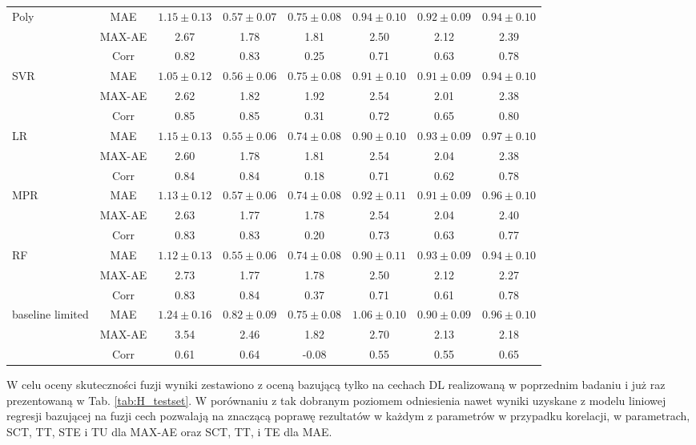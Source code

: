 \begin{table}[h]
\begin{center}
\begin{tabular}{lc||c|c|c|c|c|c}
			\hline
			\multirow{3}{*}{Poly}
			& MAE & $1.15\pm0.13$ & $0.57\pm0.07$ & $0.75\pm0.08$ & $0.94\pm0.10$ & $0.92\pm0.09$ & $0.94\pm0.10$\\
			& MAX-AE & 2.67 & 1.78 & 1.81 & 2.50 & 2.12 & 2.39 \\
			& Corr   & 0.82 & 0.83 & 0.25 & 0.71 & 0.63 & 0.78 \\
			\hline
			\multirow{3}{*}{SVR}
			& MAE & $1.05\pm0.12$ & $0.56\pm0.06$ & $0.75\pm0.08$ & $0.91\pm0.10$ & $0.91\pm0.09$ & $0.94\pm0.10$\\
			& MAX-AE & 2.62 & 1.82 & 1.92 & 2.54 & 2.01 & 2.38 \\
			& Corr   & 0.85 & 0.85 & 0.31 & 0.72 & 0.65 & 0.80 \\
			\hline
			\multirow{3}{*}{LR}
			& MAE & $1.15\pm0.13$ & $0.55\pm0.06$ & $0.74\pm0.08$ & $0.90\pm0.10$ & $0.93\pm0.09$ & $0.97\pm0.10$\\
			& MAX-AE & 2.60 & 1.78 & 1.81 & 2.54 & 2.04 & 2.38 \\
			& Corr   & 0.84 & 0.84 & 0.18 & 0.71 & 0.62 & 0.78 \\
			\hline
			\multirow{3}{*}{MPR}
			& MAE & $1.13\pm0.12$ & $0.57\pm0.06$ & $0.74\pm0.08$ & $0.92\pm0.11$ & $0.91\pm0.09$ & $0.96\pm0.10$\\
			& MAX-AE & 2.63 & 1.77 & 1.78 & 2.54 & 2.04 & 2.40 \\
			& Corr   & 0.83 & 0.83 & 0.20 & 0.73 & 0.63 & 0.77 \\			
			\hline
			\multirow{3}{*}{RF}
			& MAE & $1.12\pm0.13$ & $0.55\pm0.06$ & $0.74\pm0.08$ & $0.90\pm0.11$ & $0.93\pm0.09$ & $0.94\pm0.10$\\
			& MAX-AE & 2.73 & 1.77 & 1.78 & 2.50 & 2.12 & 2.27 \\
			& Corr   & 0.83 & 0.84 & 0.37 & 0.71 & 0.61 & 0.78 \\
			\hline
			\multirow{3}{*}{baseline limited} 
			& MAE & $1.24\pm{0.16}$ & $0.82\pm{0.09}$ & $0.75\pm{0.08}$ & $1.06\pm{0.10}$ & $0.90\pm{0.09}$ & $0.96\pm{0.10}$ \\
			&MAX-AE & 3.54 & 2.46 & 1.82 & 2.70 & 2.13 & 2.18\\
			&Corr   & 0.61 & 0.64 &-0.08 & 0.55 & 0.55 & 0.65\\

		\end{tabular}
	\end{center}
	\label{tab:testset}
\end{table}

W celu oceny skuteczności fuzji wyniki zestawiono z oceną bazującą tylko na cechach DL realizowaną w poprzednim badaniu i już raz prezentowaną w Tab. \ref{tab:H_testset}. W porównaniu z tak dobranym poziomem odniesienia nawet wyniki uzyskane z modelu liniowej regresji bazującej na fuzji cech pozwalają na znaczącą poprawę rezultatów w każdym z parametrów w przypadku korelacji, w parametrach, SCT, TT, STE i TU dla MAX-AE oraz SCT, TT, i TE dla MAE. 

